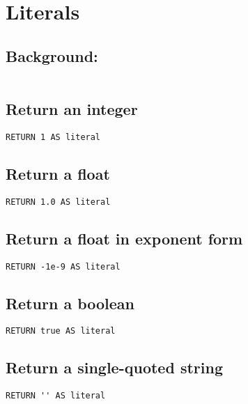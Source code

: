 \section{Literals}


\subsection{Background:}

\begin{lstlisting}
\end{lstlisting}

\subsection{Return an integer}

\begin{lstlisting}
RETURN 1 AS literal
\end{lstlisting}

\subsection{Return a float}

\begin{lstlisting}
RETURN 1.0 AS literal
\end{lstlisting}

\subsection{Return a float in exponent form}

\begin{lstlisting}
RETURN -1e-9 AS literal
\end{lstlisting}

\subsection{Return a boolean}

\begin{lstlisting}
RETURN true AS literal
\end{lstlisting}

\subsection{Return a single-quoted string}

\begin{lstlisting}
RETURN '' AS literal
\end{lstlisting}

